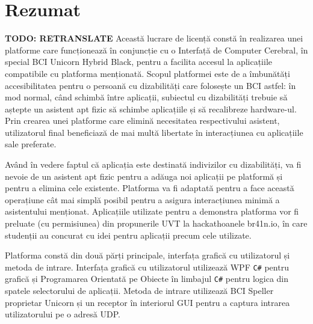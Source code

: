 
\chapter*{Rezumat}\label{cap:abstract_ro}
\textbf{TODO: RETRANSLATE}\newline
\hspace{\parindent} Această lucrare de licență constă în realizarea unei platforme care funcționează în conjuncție cu o Interfață de Computer Cerebral, în special BCI Unicorn Hybrid Black\cite{Unicorn_Technology}, pentru a facilita accesul la aplicațiile compatibile cu platforma menționată. Scopul platformei este de a îmbunătăți accesibilitatea pentru o persoană cu dizabilități care folosește un BCI astfel: în mod normal, când schimbă între aplicații, subiectul cu dizabilități trebuie să aștepte un asistent apt fizic să schimbe aplicațiile și să recalibreze hardware-ul. Prin crearea unei platforme care elimină necesitatea respectivului asistent, utilizatorul final beneficiază de mai multă libertate în interacțiunea cu aplicațiile sale preferate.

\vspace*{2mm}
\hspace{\parindent} Având în vedere faptul că aplicația este destinată indivizilor cu dizabilități, va fi nevoie de un asistent apt fizic pentru a adăuga noi aplicații pe platformă și pentru a elimina cele existente. Platforma va fi adaptată pentru a face această operațiune cât mai simplă posibil pentru a asigura interacțiunea minimă a asistentului menționat. Aplicațiile utilizate pentru a demonstra platforma vor fi preluate (cu permisiunea) din propunerile UVT la hackathoanele br41n.io, în care studenții au concurat cu idei pentru aplicații precum cele utilizate.

\vspace*{2mm}
\hspace{\parindent} Platforma constă din două părți principale, interfața grafică cu utilizatorul și metoda de intrare. Interfața grafică cu utilizatorul utilizează WPF \texttt{C\#} pentru grafică și Programarea Orientată pe Obiecte în limbajul \texttt{C\#} pentru logica din spatele selectorului de aplicații. Metoda de intrare utilizează BCI Speller proprietar Unicorn\cite{Unicorn_Speller} și un receptor în interiorul GUI pentru a captura intrarea utilizatorului pe o adresă UDP.


